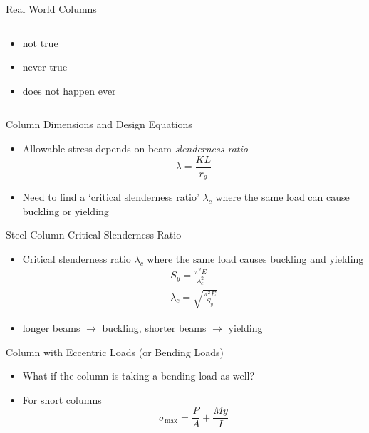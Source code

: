 \documentclass[10pt, svgnames]{beamer}
\begin{document}
\begin{frame}[label={sec:org5baf740}]{Real World Columns}
\begin{columns}
\begin{column}{0.4\columnwidth}
\begin{itemize}
\item not true
\item never true
\item does not happen ever
\end{itemize}
\end{column}
\end{columns}
\end{frame}

\begin{frame}[label={sec:orgc85bc86}]{Column Dimensions and Design Equations}
\begin{itemize}
\item Allowable stress depends on beam \emph{slenderness ratio}
$$ \lambda = \frac{KL}{r_g} $$
\item Need to find a `critical slenderness ratio' \(\lambda_c\) where the same load can cause buckling or yielding
\end{itemize}
\end{frame}


\begin{frame}[label={sec:orgafe2860}]{Steel Column Critical Slenderness Ratio}
\begin{itemize}
\item Critical slenderness ratio \(\lambda_c\) where the same load causes buckling and yielding
\begin{gather*}
  S_y = \frac{\pi ^2E}{\lambda_c^2} \\
  \lambda_c = \sqrt {\frac{\pi^2E}{S_y}}
\end{gather*}
\item longer beams \(\rightarrow\) buckling, shorter beams \(\rightarrow\) yielding
\end{itemize}
\end{frame}

\begin{frame}[label={sec:org5e587d5}]{Column with Eccentric Loads (or Bending Loads)}
\begin{itemize}
\item What if the column is taking a bending load as well?
\item For short columns
\begin{equation*}
  \sigma_{\max} = \frac{P}{A} + \frac{My}{I}
\end{equation*}
\end{itemize}
\end{frame}
\end{document}
